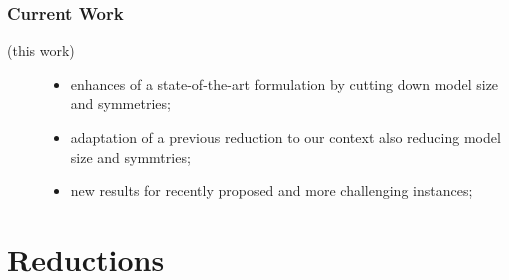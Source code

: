 \documentclass{beamer}
\newcommand{\currentsection}{}
\newcommand{\mysection}[1]{\renewcommand{\currentsection}{#1}\section{#1}}
\begin{document}
\begin{frame}[fragile]
\frametitle{Current Work}
\centering
\begin{description}
\item[(this work)] \begin{itemize}
\item enhances of a state-of-the-art formulation by cutting down model size and symmetries;
\item adaptation of a previous reduction to our context also reducing model size and symmtries;
\item new results for recently proposed and more challenging instances;
\end{itemize}
\end{description}
\end{frame}

\mysection{Reductions}
\end{document}
